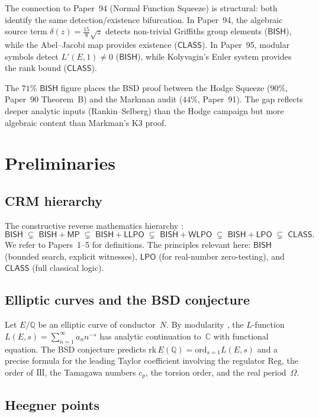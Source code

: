 \documentclass[11pt]{article}
\theoremstyle{plain}
\theoremstyle{definition}
\theoremstyle{remark}
\newcommand{\Q}{\mathbb{Q}}
\newcommand{\C}{\mathbb{C}}
\newcommand{\Sha}{\text{\raisebox{0.05ex}{\scalebox{0.85}[1]{III}}}}
\newcommand{\rk}{\mathrm{rk}}
\newcommand{\ord}{\mathrm{ord}}
\newcommand{\Reg}{\mathrm{Reg}}
\newcommand{\BISH}{\ensuremath{\mathsf{BISH}}}
\newcommand{\LPO}{\ensuremath{\mathsf{LPO}}}
\newcommand{\WLPO}{\ensuremath{\mathsf{WLPO}}}
\newcommand{\LLPO}{\ensuremath{\mathsf{LLPO}}}
\newcommand{\MP}{\ensuremath{\mathsf{MP}}}
\newcommand{\CLASS}{\ensuremath{\mathsf{CLASS}}}
\begin{document}
The connection to Paper~94 (Normal Function Squeeze) is structural: both identify the same detection/existence bifurcation. In Paper~94, the algebraic source term $\delta(z) = \tfrac{15}{8}\sqrt{z}$ detects non-trivial Griffiths group elements ($\BISH$), while the Abel--Jacobi map provides existence ($\CLASS$). In Paper~95, modular symbols detect $L'(E,1) \neq 0$ ($\BISH$), while Kolyvagin's Euler system provides the rank bound ($\CLASS$).

The $71\%$ $\BISH$ figure places the BSD proof between the Hodge Squeeze ($90\%$, Paper~90 Theorem~B) and the Markman audit ($44\%$, Paper~91). The gap reflects deeper analytic inputs (Rankin--Selberg) than the Hodge campaign but more algebraic content than Markman's K3 proof.


\section{Preliminaries}
\label{sec:prelim}

\subsection{CRM hierarchy}

The constructive reverse mathematics hierarchy \cite{bridges-richman,paper1,paper40}:
\[
\BISH \;\subsetneq\; \BISH{+}\MP \;\subsetneq\; \BISH{+}\LLPO \;\subsetneq\; \BISH{+}\WLPO \;\subsetneq\; \BISH{+}\LPO \;\subsetneq\; \CLASS.
\]
We refer to Papers~1--5 for definitions. The principles relevant here: $\BISH$ (bounded search, explicit witnesses), $\LPO$ (for real-number zero-testing), and $\CLASS$ (full classical logic).

\subsection{Elliptic curves and the BSD conjecture}

Let $E/\Q$ be an elliptic curve of conductor~$N$. By modularity \cite{wiles,taylor-wiles,bcdt}, the $L$-function $L(E,s) = \sum_{n=1}^\infty a_n n^{-s}$ has analytic continuation to~$\C$ with functional equation. The BSD conjecture predicts $\rk\, E(\Q) = \ord_{s=1} L(E,s)$ and a precise formula for the leading Taylor coefficient involving the regulator $\Reg$, the order of $\Sha$, the Tamagawa numbers $c_p$, the torsion order, and the real period~$\Omega$.

\subsection{Heegner points}
\end{document}
